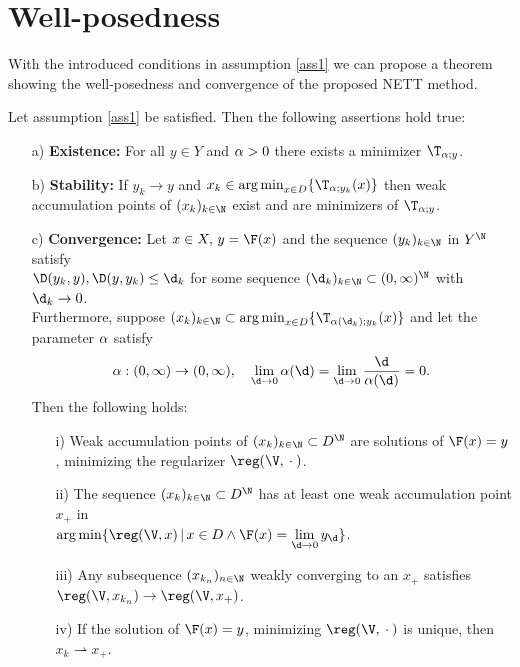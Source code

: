 \section{Well-posedness}

With the introduced conditions in assumption \ref{ass1} we can propose a theorem showing the well-posedness and convergence of the proposed NETT method.

\begin{theorem}\label{theorem1}
Let assumption \ref{ass1} be satisfied. Then the following assertions hold true:
\begin{itemize}
\item[a)]\textbf{Existence:} For all $y \in Y$ and $\alpha > 0$ there exists a minimizer $\T_{\a;y}$.
\vspace{0.3cm}
\item[b)]\textbf{Stability:} If $y_k \to y$ and $x_k \in \argmin_{x\in D}\{\T_{\a;y_k}(x)\}$ then weak accumulation points of $(x_k)_{k \in \N}$ exist and are minimizers of $\T_{\a;y}$.
\vspace{0.3cm}
\item[c)]\textbf{Convergence:} Let $x \in X, \, y = \F(x)$ and the sequence $(y_k)_{k \in \N}$ in $Y^{\N}$ satisfy\\ $\D(y_k,y), \D(y,y_k)\leq \d_k$ for some sequence $(\d_{k})_{k \in \N} \subset (0,\infty)^{\N}$ with $\d_{k}\to 0$.\\ Furthermore, suppose $(x_k)_{k\in\N} \subset \argmin_{x\in D}\{\T_{\a(\d_k);y_k}(x)\}$ and let the parameter $\alpha$ satisfy
\begin{align}\label{param}
\a: (0,\infty) \to (0, \infty), \quad \lim_{\d \to 0} \a(\d) = \lim_{\d \to 0} \frac{\d}{\a(\d)} = 0.
\end{align}
Then the following holds:
\begin{itemize}
\item[i)] Weak accumulation points of $(x_k)_{k \in\N} \subset D^{\N}$ are solutions of $\F(x)=y$, minimizing the regularizer $\reg(\V,\wc)$.
\item[ii)] The sequence $(x_k)_{k\in\N} \subset D^{\N}$ has at least one weak accumulation point $x_+$ in\\ $\argmin\{\reg(\V,x)\,|\,x \in D \wedge \F(x) = \displaystyle\lim_{\d \to 0}y_{\d}\}$.
\item[iii)] Any subsequence $(x_{k_n})_{n\in\N}$ weakly converging to an $x_+$ satisfies $\reg(\V,x_{k_n})\to \reg(\V,x_+)$.
\item[iv)] If the solution of $\F(x) = y$, minimizing $\reg(\V,\wc)$ is unique, then $x_k \rightharpoonup x_+$.
\end{itemize}
\end{itemize}
\end{theorem}

